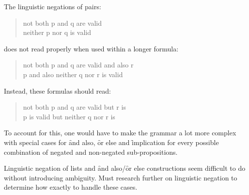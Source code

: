 \documentclass[a4paper]{article}
\begin{document}
The linguistic negations of pairs:
\begin{quote}
not both p and q are valid\\
neither p nor q is valid\\
\end{quote}
does not read properly when used within a longer formula:
\begin{quote}
    not both p and q are valid and also r\\
    p and also neither q nor r is valid\\
\end{quote}
Instead, these formulas should read:
\begin{quote}
    not both p and q are valid but r is\\
    p is valid but neither q nor r is
\end{quote}
To account for this, one would have to make the grammar a lot more complex
with special cases for \f{and also}, \f{or else} and \f{implication} for 
every possible combination of negated and non-negated sub-propositions.

Linguistic negation of lists and \f{and also}/\f{or else} constructions
seem difficult to do without introducing ambiguity.
Must research further on linguistic negation to determine how exactly to 
handle these cases.
\label{LastBody}
\end{document}
